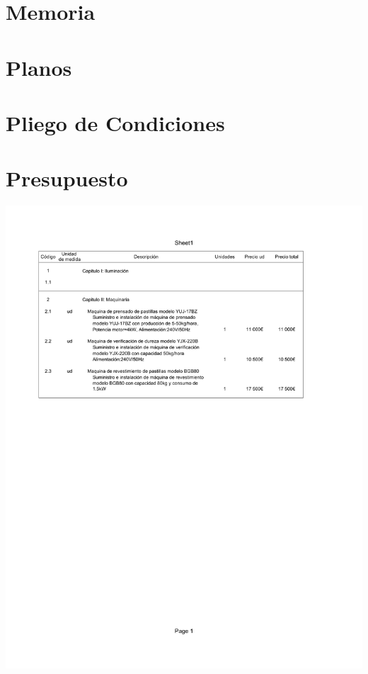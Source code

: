 \documentclass[11pt, a4paper]{article}
\begin{document}



\setlength{\parindent}{0cm}


\newpage
\tableofcontents
\clearpage


\part{Memoria} 





\newpage

\part{Planos} 





\newpage

\part{Pliego de Condiciones} 





\newpage

\part{Presupuesto} 

%

\vspace*{-2cm}
\hspace*{-2cm}
\includegraphics{Presupuesto/presupuesto.pdf}
\end{document}
